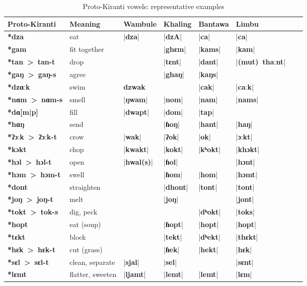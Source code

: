 \documentclass[oldfontcommands,oneside,a4paper,11pt]{article}
\newcommand{\ipa}[1]{\textbf{{\phon\mbox{#1}}}} %
\newcommand{\dhat}[1]{|\ipa{#1}|}
\begin{document}
 \begin{table}[H]
 \caption{Proto-Kiranti vowels: representative examples} \centering \label{tab:vowels.ex}
 \begin{tabular}{llllllll}
 \toprule
Proto-Kiranti & Meaning &Wambule & Khaling & Bantawa & Limbu \\
 \midrule
\ipa{*dza} &	eat &	\dhat{dza} &	\dhat{dzA} &	\dhat{ca} &	\dhat{ca} &	\\
\ipa{*gam} &	fit together &	&	\dhat{ghɛm} &	\dhat{kams} &	\dhat{kam} &	\\
\ipa{*tan > tan-t} &	drop &	&	\dhat{tɛnt} &	\dhat{dant} &	\dhat{(mut) thaːnt} &	\\
\ipa{*gaŋ > gaŋ-s} &	agree &	&	\dhat{ghaŋ} &	\dhat{kaŋs} &	&	\\
 \midrule						
\ipa{*dzɑːk} &	swim &	\ipa{dzwak } &	&	\dhat{cak} &	\dhat{caːk} &	\\
\ipa{*nɑm > nɑm-s} &	smell &	\dhat{ŋwam} &	\dhat{nom} &	\dhat{nam} &	\dhat{nams} &	\\
\ipa{*dɑ[m|p]} &	fill &	\dhat{dwapt} &	\dhat{dom} &	\dhat{tap} &	&	\\
\ipa{*hɑŋ} &	send &	&	\dhat{ɦoŋ} &	\dhat{hant} &	\dhat{haŋ} &	\\
\midrule
\ipa{*ʔɔːk > ʔɔːk-t} &	crow &	\dhat{wak} &	\dhat{ʔok} &	\dhat{ok} &	\dhat{ɔːkt} &	\\
\ipa{*kɔkt} &	chop &	\dhat{kwakt} &	\dhat{kokt} &	\dhat{kʰokt} &	\dhat{khɔkt} &	\\
\ipa{*hɔl > hɔl-t} &	open &	\dhat{hwal(s)} &	\dhat{ɦol} &	&	\dhat{hɔnt} &	\\
\ipa{*hɔm > hɔm-t} &	swell &	&	\dhat{ɦom} &	\dhat{hom} &	\dhat{hɔmt} &	\\
\midrule
\ipa{*dont} &	straighten &	&	\dhat{dhont} &	\dhat{tont} &	\dhat{tont} &	\\
\ipa{*joŋ > joŋ-t} &	melt &	&	\dhat{joŋ} &	&	\dhat{jont} &	\\
\ipa{*tokt > tok-s} &	dig, peck &	&	&	\dhat{dʰokt} &	\dhat{toks} &	\\
\ipa{*hopt} &	eat (soup) &	&	\dhat{ɦopt} &	\dhat{hopt} &	\dhat{hopt} &	\\
\midrule
\ipa{*tɛkt} &	block &	&	\dhat{tekt} &	\dhat{dʰekt} &	\dhat{thɛkt} &	\\
\ipa{*hɛk > hɛk-t} &	cut (grass) &	&	\dhat{ɦek} &	\dhat{hekt} &	\dhat{hɛk} &	\\
\ipa{*sɛl > sɛl-t} &	clean, separate &	\dhat{sjal} &	\dhat{sel} &	&	\dhat{sɛnt} &	\\
\ipa{*lɛmt} &	flatter, sweeten &	\dhat{ljamt} &	\dhat{lemt} &	\dhat{lemt} &	\dhat{lɛm} &	\\

\end{tabular}
\end{table}
\end{document}
